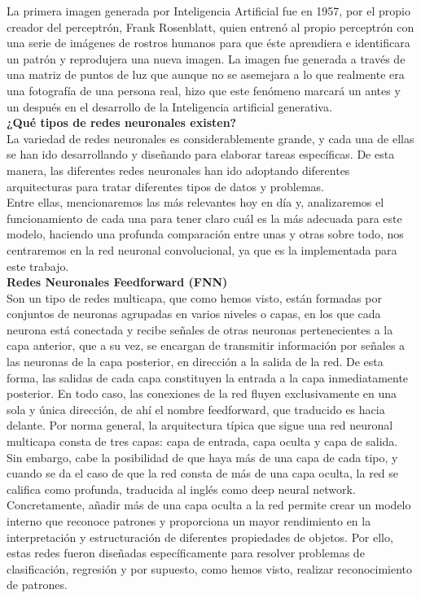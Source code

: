 La primera imagen generada por Inteligencia Artificial fue en 1957, por el propio creador del perceptrón, Frank Rosenblatt, quien entrenó al propio perceptrón con una serie de imágenes de rostros humanos para que éste aprendiera e identificara un patrón y reprodujera una nueva imagen. La imagen fue generada a través de una matriz de puntos de luz que aunque no se asemejara a lo que realmente era una fotografía de una persona real, hizo que este fenómeno marcará un antes y un después en el desarrollo de la Inteligencia artificial generativa.\\

\textbf{¿Qué tipos de redes neuronales existen?}\\

La variedad de redes neuronales es considerablemente grande, y cada una de ellas se han ido desarrollando y diseñando para elaborar tareas específicas. De esta manera, las diferentes redes neuronales han ido adoptando diferentes arquitecturas para tratar diferentes tipos de datos y problemas.\\
Entre ellas, mencionaremos las más relevantes hoy en día y, analizaremos el funcionamiento de cada una para tener claro cuál es la más adecuada para este modelo, haciendo una profunda comparación entre unas y otras sobre todo, nos centraremos en la red neuronal convolucional, ya que es la implementada para este trabajo.\\



\textbf{Redes Neuronales Feedforward (FNN)}\\

Son un tipo de redes multicapa, que como hemos visto, están formadas por conjuntos de neuronas agrupadas en varios niveles o capas, en los que cada neurona está conectada y recibe señales de otras neuronas pertenecientes a la capa anterior, que a su vez, se encargan de transmitir información por señales a las neuronas de la capa posterior, en dirección a la salida de la red. De esta forma, las salidas de cada capa constituyen la entrada a la capa inmediatamente posterior. En todo caso, las conexiones de la red fluyen exclusivamente en una sola y única dirección, de ahí el nombre feedforward, que traducido es hacia delante. Por norma general, la arquitectura típica que sigue una red neuronal multicapa consta de tres capas: capa de entrada, capa oculta y capa de salida. \\

Sin embargo, cabe la posibilidad de que haya más de una capa de cada tipo, y cuando se da el caso de que la red consta de más de una capa oculta, la red se califica como profunda, traducida al inglés como deep neural network. Concretamente, añadir más de una capa oculta a la red permite crear un modelo interno que reconoce patrones y proporciona un mayor rendimiento en la interpretación y estructuración de diferentes propiedades de objetos. Por ello, estas redes fueron diseñadas específicamente para resolver problemas de clasificación, regresión y por supuesto, como hemos visto, realizar reconocimiento de patrones.\\

